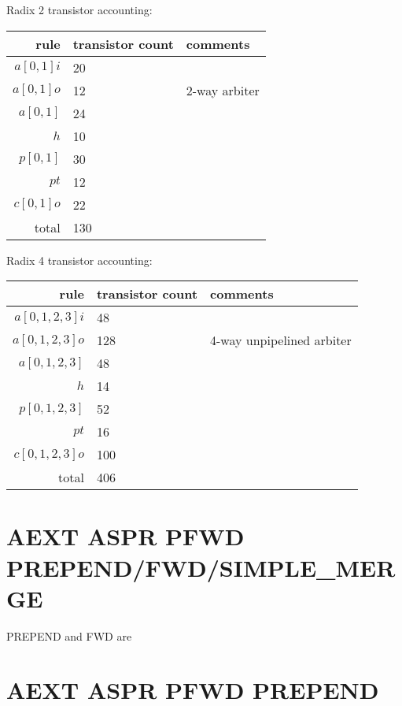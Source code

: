 \documentclass{article}
\begin{document}
\noindent Radix 2 transistor accounting: 

\begin{center}
    \begin{tabular}{|r|l|l|}
    \hline
    rule & transistor count & comments \\ \hline
    $a[0,1]i$ & 20 & \\ \hline
    $a[0,1]o$ & 12 & 2-way arbiter \\ \hline
    $a[0,1]$ & 24 & \\ \hline
    $h$ & 10 & \\ \hline
    $p[0,1]$ & 30 & \\ \hline
    $pt$ & 12 & \\ \hline
    $c[0,1]o$ & 22 & \\ \hline
    \hline total & 130 & \\ \hline
    \end{tabular}
\end{center}

\noindent Radix 4 transistor accounting: 

\begin{center}
    \begin{tabular}{|r|l|l|}
    \hline
    rule & transistor count & comments \\ \hline
    $a[0,1,2,3]i$ & 48 & \\ \hline
    $a[0,1,2,3]o$ & 128 & 4-way unpipelined arbiter \\ \hline
    $a[0,1,2,3]$ & 48 & \\ \hline
    $h$ & 14 & \\ \hline
    $p[0,1,2,3]$ & 52 & \\ \hline
    $pt$ & 16 & \\ \hline
    $c[0,1,2,3]o$ & 100 & \\ \hline
    \hline total & 406 & \\ \hline
    \end{tabular}
\end{center}

\section{AEXT ASPR PFWD PREPEND/FWD/SIMPLE\_MERGE}

PREPEND and FWD are

\section{AEXT ASPR PFWD PREPEND}
\end{document}
